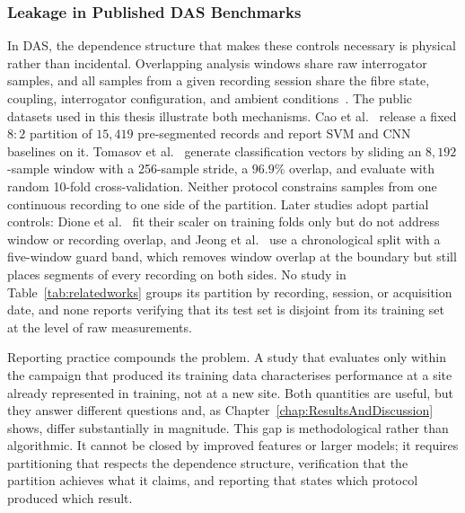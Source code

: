 \subsubsection{Leakage in Published DAS Benchmarks}
\label{sec:chap2LeakDAS}
In DAS, the dependence structure that makes these controls necessary is physical rather than incidental. Overlapping analysis windows share raw interrogator samples, and all samples from a given recording session share the fibre state, coupling, interrogator configuration, and ambient conditions~\cite{tomasov2025dataset,caoxin2023opendataset}. The public datasets used in this thesis illustrate both mechanisms. Cao et al.~\cite{caoxin2023opendataset} release a fixed $8{:}2$ partition of $15{,}419$ pre-segmented records and report SVM and CNN baselines on it. Tomasov et al.~\cite{tomasov2025perimeter} generate classification vectors by sliding an $8{,}192$-sample window with a 256-sample stride, a $96.9\%$ overlap, and evaluate with random 10-fold cross-validation. Neither protocol constrains samples from one continuous recording to one side of the partition. Later studies adopt partial controls: Dione et al.~\cite{dione2025intrusion} fit their scaler on training folds only but do not address window or recording overlap, and Jeong et al.~\cite{jeong2026s2dygnn} use a chronological split with a five-window guard band, which removes window overlap at the boundary but still places segments of every recording on both sides. No study in Table~\ref{tab:relatedworks} groups its partition by recording, session, or acquisition date, and none reports verifying that its test set is disjoint from its training set at the level of raw measurements.

Reporting practice compounds the problem. A study that evaluates only within the campaign that produced its training data characterises performance at a site already represented in training, not at a new site. Both quantities are useful, but they answer different questions and, as Chapter~\ref{chap:ResultsAndDiscussion} shows, differ substantially in magnitude. This gap is methodological rather than algorithmic. It cannot be closed by improved features or larger models; it requires partitioning that respects the dependence structure, verification that the partition achieves what it claims, and reporting that states which protocol produced which result.


